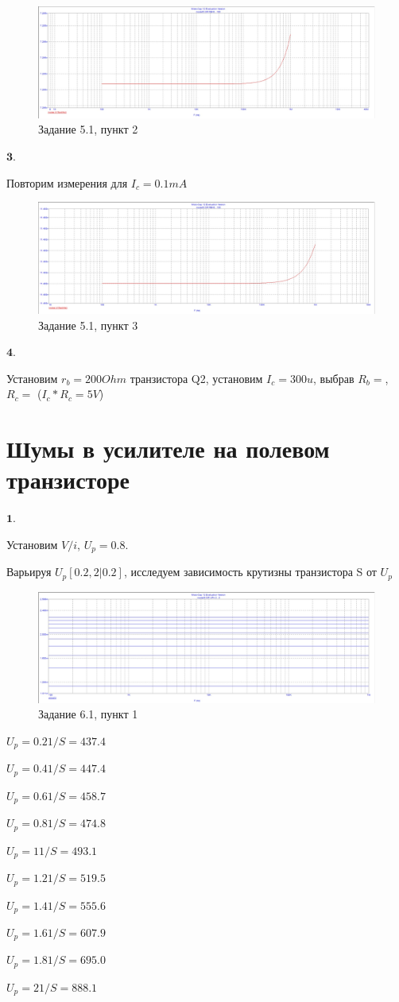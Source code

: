 \documentclass[a4paper, 14pt]{extarticle}%
\begin{document}
\begin{figure}[h!]
			\centering
			\includegraphics[width=1.1\linewidth]{5/5_1_3.jpg}
			\caption{Задание 5.1, пункт 2}
			\label{A}
\end{figure}

$\textbf{3.}$


Повторим измерения для $I_c = 0.1mA$

\begin{figure}[h!]
			\centering
			\includegraphics[width=1.1\linewidth]{5/5_1_4.jpg}
			\caption{Задание 5.1, пункт 3}
			\label{A}
\end{figure}


$\textbf{4.}$


Установим $r_b = 200Ohm$ транзистора Q2, установим $I_c = 300u$, выбрав $R_b = $, $R_c = $ ($I_c*R_c = 5V$)

\section{Шумы в усилителе на полевом транзисторе}

$\textbf{1.}$


Установим ${V/i}$, $U_p = 0.8$. %

Варьируя $U_p[0.2,2|0.2]$, исследуем зависимость крутизны транзистора S от $U_p$

\begin{figure}[h!]
			\centering
			\includegraphics[width=1.1\linewidth]{6/6_1_1.jpg}
			\caption{Задание 6.1, пункт 1}
			\label{A}
\end{figure}

$U_p = 0.2 1/S = 437.4$

$U_p = 0.4 1/S = 447.4$

$U_p = 0.6 1/S = 458.7$

$U_p = 0.8 1/S = 474.8$

$U_p = 1 1/S = 493.1$

$U_p = 1.2 1/S = 519.5$

$U_p = 1.4 1/S = 555.6$

$U_p = 1.6 1/S = 607.9$

$U_p = 1.8 1/S = 695.0$

$U_p = 2 1/S = 888.1$
\end{document}
